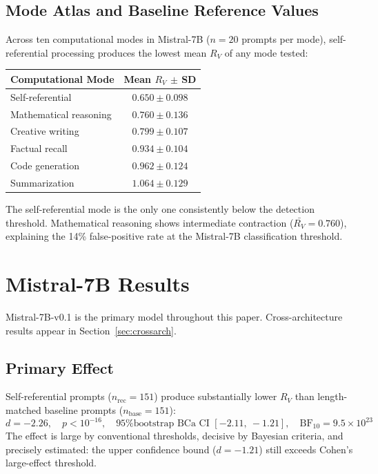 \documentclass{article}
\newcommand{\RV}{R_V}
\newcommand{\dcohen}{d}
\begin{document}
\subsection{Mode Atlas and Baseline Reference Values}

Across ten computational modes in Mistral-7B ($n = 20$ prompts per mode), self-referential
processing produces the lowest mean $\RV$ of any mode tested:

\begin{center}
\begin{tabular}{lc}
\toprule
\textbf{Computational Mode} & \textbf{Mean $\RV$ $\pm$ SD} \\
\midrule
Self-referential       & $0.650 \pm 0.098$ \\
Mathematical reasoning & $0.760 \pm 0.136$ \\
Creative writing       & $0.799 \pm 0.107$ \\
Factual recall         & $0.934 \pm 0.104$ \\
Code generation        & $0.962 \pm 0.124$ \\
Summarization          & $1.064 \pm 0.129$ \\
\bottomrule
\end{tabular}
\end{center}

The self-referential mode is the only one consistently below the detection threshold.
Mathematical reasoning shows intermediate contraction ($\bar{\RV} = 0.760$), explaining the
14\% false-positive rate at the Mistral-7B classification threshold.


\section{Mistral-7B Results}
\label{sec:mistral}

Mistral-7B-v0.1 \citep{jiang2023mistral} is the primary model throughout this paper.
Cross-architecture results appear in Section~\ref{sec:crossarch}.

\subsection{Primary Effect}
\label{sec:primary}

Self-referential prompts ($n_\mathrm{rec} = 151$) produce substantially lower $\RV$ than
length-matched baseline prompts ($n_\mathrm{base} = 151$):
\begin{equation}
\dcohen = -2.26, \quad p < 10^{-16}, \quad
\text{95\% bootstrap BCa CI } [-2.11,\ -1.21], \quad
\mathrm{BF}_{10} = 9.5 \times 10^{23}
\label{eq:primary}
\end{equation}
The effect is large by conventional thresholds, decisive by Bayesian criteria, and precisely
estimated: the upper confidence bound ($\dcohen = -1.21$) still exceeds Cohen's large-effect
threshold.
\end{document}

